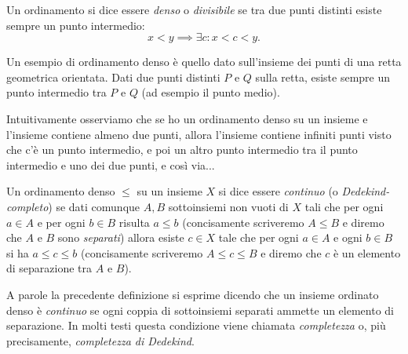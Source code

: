 \begin{definition}
  \label{def:ordinamento_denso}%
  Un ordinamento si dice essere
  \emph{denso}%
%
 o \emph{divisibile} 
  se tra due punti distinti esiste sempre un punto intermedio:
  \[
   x < y \implies \exists c \colon x < c < y.
  \]
\end{definition}

\begin{example}
Un esempio di ordinamento denso è quello dato sull'insieme dei punti 
di una retta geometrica orientata.
Dati due punti distinti $P$ e $Q$ sulla retta, 
esiste sempre un punto intermedio tra $P$ e $Q$ (ad esempio il punto medio).

Intuitivamente osserviamo che se ho un ordinamento denso su un insieme 
e l'insieme contiene almeno due punti, allora l'insieme 
contiene infiniti punti visto che c'è un punto intermedio, 
e poi un altro punto intermedio 
tra il punto intermedio e uno dei due punti, e così via...
\end{example}

\begin{definition}
  \label{def:ordinamento_continuo}%
  Un ordinamento denso $\le$ su un insieme $X$ si dice essere
  \emph{continuo}%
%
  (o \emph{Dedekind-completo})
  se dati comunque $A,B$ sottoinsiemi non vuoti di $X$
    tali che per ogni $a\in A$ e per ogni $b\in B$ risulta $a\le b$
    (concisamente scriveremo $A\le B$ e diremo che $A$ e $B$ sono 
    \emph{separati})
    allora esiste $c\in X$ tale che per ogni $a\in A$ e ogni $b\in B$ 
    si ha $a\le c \le b$ (concisamente scriveremo $A\le c \le B$
    e diremo che $c$ è un elemento di separazione tra $A$ e $B$).
\end{definition}

A parole la precedente definizione si esprime dicendo che un insieme ordinato
denso è \emph{continuo} se ogni coppia di sottoinsiemi separati 
ammette un elemento di separazione.
In molti testi questa condizione viene chiamata \emph{completezza}
o, più precisamente, \emph{completezza di Dedekind}.
%
%

